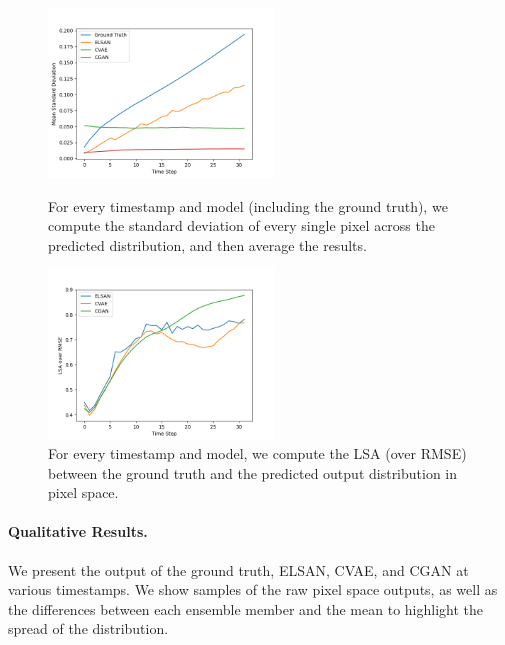 \documentclass{article}
\begin{document}
\begin{figure}
    \centering
    \begin{minipage}{0.4 \textwidth}
        \centering
        \includegraphics[width=6cm]{std}
        \caption{For every timestamp and model (including the ground truth), we compute the standard deviation of every single pixel across the predicted distribution, and then average the results.}
        \label{standard_deviation}
    \end{minipage}
    \hspace{1cm}
    \begin{minipage}{0.4 \textwidth}
        \centering
        \includegraphics[width=6cm]{lsa}
        \caption{For every timestamp and model, we compute the LSA (over RMSE) between the ground truth and the predicted output distribution in pixel space.}
        \label{output_lsa}
    \end{minipage}
\end{figure}

\paragraph{Qualitative Results.}
We present the output of the ground truth, ELSAN, CVAE, and CGAN at various timestamps. We show samples of the raw pixel space outputs, as well as the differences between each ensemble member and the mean to highlight the spread of the distribution.
\end{document}
